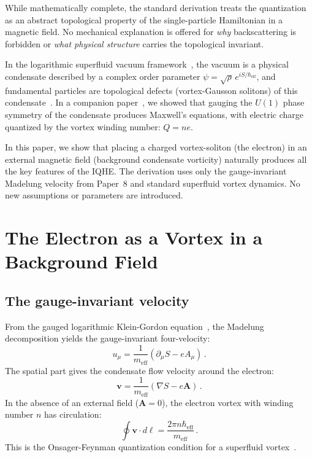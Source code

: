 \documentclass[12pt, a4paper]{article}
\newcommand{\meff}{m_{\mathrm{eff}}}
\newcommand{\heff}{\hbar_{\mathrm{eff}}}
\begin{document}
While mathematically complete, the standard
derivation treats the quantization as an abstract
topological property of the single-particle
Hamiltonian in a magnetic field. No mechanical
explanation is offered for \emph{why} backscattering
is forbidden or \emph{what physical structure}
carries the topological invariant.

In the logarithmic superfluid vacuum
framework~\cite{kulangiev_gravity,kulangiev_geff},
the vacuum is a physical condensate described by a
complex order parameter
$\psi = \sqrt{\rho}\,e^{iS/\heff}$, and
fundamental particles are topological defects
(vortex-Gausson solitons) of this
condensate~\cite{kulangiev_planck,kulangiev_inertia}.
In a companion paper~\cite{kulangiev_maxwell}, we
showed that gauging the $U(1)$ phase symmetry of
the condensate produces Maxwell's equations, with
electric charge quantized by the vortex winding
number: $Q = ne$.

In this paper, we show that placing a charged
vortex-soliton (the electron) in an external
magnetic field (background condensate vorticity)
naturally produces all the key features of the IQHE.
The derivation uses only the gauge-invariant
Madelung velocity from Paper~8 and standard
superfluid vortex dynamics. No new assumptions or
parameters are introduced.


\section{The Electron as a Vortex in a Background
Field}
\label{sec:setup}

\subsection{The gauge-invariant velocity}

From the gauged logarithmic Klein-Gordon
equation~\cite{kulangiev_maxwell}, the Madelung
decomposition yields the gauge-invariant
four-velocity:
\begin{equation}
    u_\mu = \frac{1}{\meff}
    (\partial_\mu S - eA_\mu)\,.
\label{eq:u_gauge}
\end{equation}
The spatial part gives the condensate flow velocity
around the electron:
\begin{equation}
    \mathbf{v} = \frac{1}{\meff}
    (\nabla S - e\mathbf{A})\,.
\label{eq:v_gauge}
\end{equation}
In the absence of an external field
($\mathbf{A} = 0$), the electron vortex with winding
number $n$ has circulation:
\begin{equation}
    \oint \mathbf{v}\cdot d\boldsymbol{\ell}
    = \frac{2\pi n\heff}{\meff}\,.
\label{eq:circulation}
\end{equation}
This is the Onsager-Feynman quantization condition
for a superfluid vortex~\cite{feynman_1955}.
\end{document}
